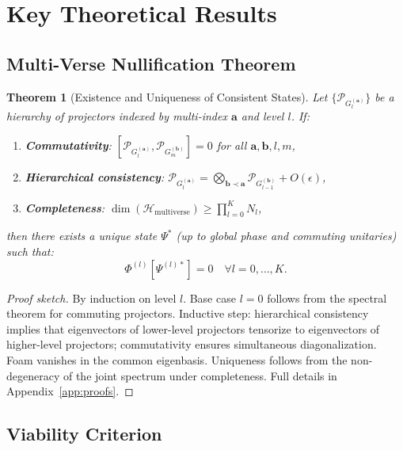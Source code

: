 \documentclass[11pt,a4paper]{article}
\theoremstyle{plain}
\newtheorem{theorem}{Theorem}[section]
\theoremstyle{definition}
\theoremstyle{remark}
\newcommand{\Hilbert}{\mathcal{H}}
\newcommand{\Foam}{\Phi}
\newcommand{\Projector}{\mathcal{P}}
\begin{document}
\section{Key Theoretical Results}
\label{sec:theorems}

\subsection{Multi-Verse Nullification Theorem}

\begin{theorem}[Existence and Uniqueness of Consistent States]
\label{thm:nullification}
Let $\{\Projector_{G_l^{(\mathbf{a})}}\}$ be a hierarchy of projectors indexed by multi-index $\mathbf{a}$ and level $l$. If:
\begin{enumerate}[label=(\roman*)]
    \item \textbf{Commutativity}: $[\Projector_{G_l^{(\mathbf{a})}}, \Projector_{G_m^{(\mathbf{b})}}] = 0$ for all $\mathbf{a},\mathbf{b},l,m$,
    \item \textbf{Hierarchical consistency}: $\Projector_{G_l^{(\mathbf{a})}} = \bigotimes_{\mathbf{b} \prec \mathbf{a}} \Projector_{G_{l-1}^{(\mathbf{b})}} + O(\epsilon)$,
    \item \textbf{Completeness}: $\dim(\Hilbert_{\text{multiverse}}) \geq \prod_{l=0}^K N_l$,
\end{enumerate}
then there exists a unique state $\Psi^*$ (up to global phase and commuting unitaries) such that:
\begin{equation}
\Foam^{(l)}[\Psi^{(l)*}] = 0 \quad \forall l = 0,\dots,K.
\label{eq:full_nullification}
\end{equation}
\end{theorem}

\begin{proof}[Proof sketch]
By induction on level $l$. Base case $l=0$ follows from the spectral theorem for commuting projectors. Inductive step: hierarchical consistency implies that eigenvectors of lower-level projectors tensorize to eigenvectors of higher-level projectors; commutativity ensures simultaneous diagonalization. Foam vanishes in the common eigenbasis. Uniqueness follows from the non-degeneracy of the joint spectrum under completeness. Full details in Appendix~\ref{app:proofs}.
\end{proof}

\subsection{Viability Criterion}
\end{document}
